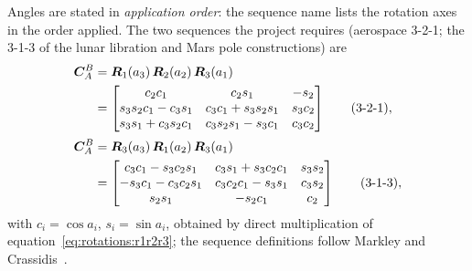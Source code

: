 Angles are stated in \emph{application order}: the sequence name lists the
rotation axes in the order applied. The two sequences the project requires
(aerospace 3-2-1; the 3-1-3 of the lunar libration and Mars pole
constructions) are
\begin{align}
  \bm{C}_{A}^{B} &= \bm{R}_1(a_3)\,\bm{R}_2(a_2)\,\bm{R}_3(a_1)
  \nonumber \\
  &=
  \begin{bmatrix}
    c_2 c_1 & c_2 s_1 & -s_2 \\
    s_3 s_2 c_1 - c_3 s_1 & c_3 c_1 + s_3 s_2 s_1 & s_3 c_2 \\
    s_3 s_1 + c_3 s_2 c_1 & c_3 s_2 s_1 - s_3 c_1 & c_3 c_2
  \end{bmatrix}
  \qquad \text{(3-2-1)},
  \label{eq:rotations:e321} \\[2pt]
  \bm{C}_{A}^{B} &= \bm{R}_3(a_3)\,\bm{R}_1(a_2)\,\bm{R}_3(a_1)
  \nonumber \\
  &=
  \begin{bmatrix}
    c_3 c_1 - s_3 c_2 s_1 & c_3 s_1 + s_3 c_2 c_1 & s_3 s_2 \\
    -s_3 c_1 - c_3 c_2 s_1 & c_3 c_2 c_1 - s_3 s_1 & c_3 s_2 \\
    s_2 s_1 & -s_2 c_1 & c_2
  \end{bmatrix}
  \qquad \text{(3-1-3)},
  \label{eq:rotations:e313}
\end{align}
with $c_i = \cos a_i$, $s_i = \sin a_i$, obtained by direct multiplication
of equation~\eqref{eq:rotations:r1r2r3}; the sequence definitions follow
Markley and Crassidis~\cite{markley2014}.

